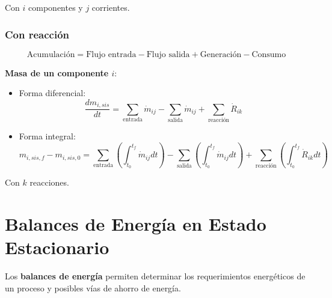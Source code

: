         Con \(i\) componentes y \(j\) corrientes.
        
        \subsubsection{Con reacción}
        \[\text{Acumulación} = \text{Flujo entrada} - \text{Flujo salida} + \text{Generación} - \text{Consumo}\]
        
        \textbf{Masa de un componente \(i\)}:
        
        \begin{itemize}
            \item Forma diferencial:
            \begin{equation}
            \label{eq:proc_int_con_i_dif}
                \frac{dm_{i, sis}}{dt} = \sum_{\text{entrada}}\dot{m}_{ij} - \sum_{\text{salida}}\dot{m}_{ij} + \sum_{\text{reacción}}\dot{R}_{ik}
            \end{equation}
            \item Forma integral:
            \begin{equation}
            \label{eq:proc_int_con_i_int}
                m_{i, sis, f} - m_{i, sis, 0} = \sum_{\text{entrada}}\left ( \int_{t_{0}}^{t_{f}}\dot{m}_{ij}dt \right ) - \sum_{\text{salida}}\left ( \int_{t_{0}}^{t_{f}}\dot{m}_{ij}dt \right ) + \sum_{\text{reacción}}\left ( \int_{t_{0}}^{t_{f}}\dot{R}_{ik}dt \right )
            \end{equation}
        \end{itemize}
        
        Con \(k\) reacciones.
    
\newpage
            
\section{Balances de Energía en Estado Estacionario}
    
\begin{quote}
\end{quote}

Los \textbf{balances de energía} permiten determinar los requerimientos energéticos de un proceso y posibles vías de ahorro de energía.


